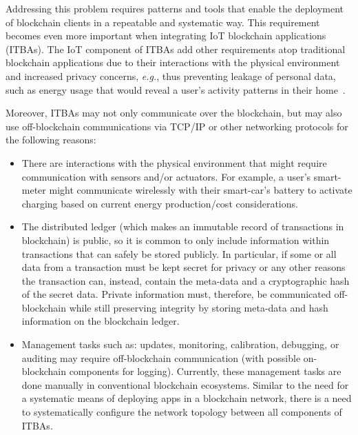 Addressing this problem requires patterns and tools that enable the deployment of blockchain clients in a repeatable and systematic way.
This requirement becomes even more important when integrating IoT blockchain applications (ITBAs). The IoT component of ITBAs add other requirements atop traditional blockchain applications due to their interactions with the physical environment and increased privacy concerns, \emph{e.g.}, thus preventing leakage of personal data, such as  energy usage that would reveal a user's activity patterns in their home~\cite{gubbi2013IoT}.  

Moreover, ITBAs may not only communicate over the blockchain, but may also use off-blockchain communications via TCP/IP or other networking protocols for the following reasons:
\begin{itemize}
\item  There are interactions with the physical environment that might require communication with sensors and/or actuators.  For example, a user's smart-meter might communicate wirelessly with their smart-car's battery to activate charging based on current energy production/cost considerations. 
\item The distributed ledger (which makes an immutable record of transactions in blockchain) is public, so it is common to only  include information within transactions that can safely be stored publicly. In particular, if some or all data from a transaction must be kept secret for privacy or any other reasons the transaction can, instead, contain the meta-data and a cryptographic hash of the secret data.  Private information must, therefore, be communicated off-blockchain while still preserving integrity by storing meta-data and hash information on the blockchain ledger.
\item Management tasks such as: updates, monitoring, calibration, debugging, or auditing may require off-blockchain communication (with possible on-blockchain components for logging). Currently, these management tasks are done manually in conventional blockchain ecosystems. Similar to the need for a systematic means of deploying apps in a blockchain network, there is a need to systematically configure the network topology between all components of ITBAs.
\end{itemize}

